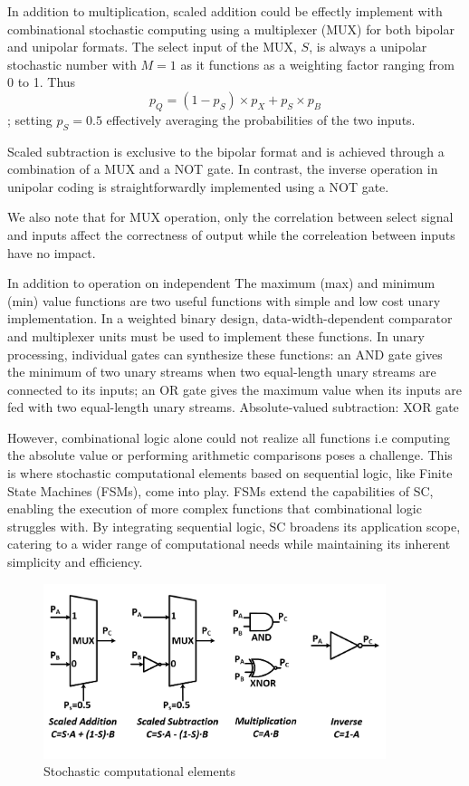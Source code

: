In addition to multiplication, scaled addition could be effectly implement with combinational stochastic computing using a multiplexer (MUX) for both bipolar and unipolar formats. The select input of the MUX, \(S\), is always a unipolar stochastic number with $M = 1$ as it functions as a weighting factor ranging from 0 to 1. Thus $$p_Q = (1 - p_S) \times p_X + p_S \times p_B$$; setting $p_S = 0.5$ effectively averaging the probabilities of the two inputs.

Scaled subtraction is exclusive to the bipolar format and is achieved through a combination of a MUX and a NOT gate. In contrast, the inverse operation in unipolar coding is straightforwardly implemented using a NOT gate. 

We also note that for MUX operation, only the correlation between select signal and inputs affect the correctness of output while the correleation between inputs have no impact.  

In addition to operation on independent 
The maximum (max) and minimum (min) value functions are two useful functions
with simple and low cost unary implementation. In a weighted binary design,
data-width-dependent comparator and multiplexer units must be used to implement
these functions. In unary processing, individual gates can synthesize these
functions: an AND gate gives the minimum of two unary streams when two
equal-length unary streams are connected to its inputs; an OR gate gives the
maximum value when its inputs are fed with two equal-length unary streams.
Absolute-valued subtraction: XOR gate



However, combinational logic alone could not realize all functions i.e computing the absolute value or performing arithmetic comparisons poses a challenge. This is where stochastic computational elements based on sequential logic, like Finite State Machines (FSMs), come into play. FSMs extend the capabilities of SC, enabling the execution of more complex functions that combinational logic struggles with. By integrating sequential logic, SC broadens its application scope, catering to a wider range of computational needs while maintaining its inherent simplicity and efficiency.

\begin{figure}[htb]
	\includegraphics[width=10cm]{gfx/SC elements.png}
	\caption{Stochastic computational elements}
	\label{fig:system:example1}
\end{figure}

